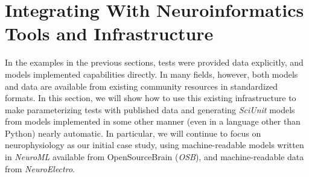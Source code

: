 \documentclass{frontiersSCNS}
\begin{document}
\section{Integrating With Neuroinformatics Tools and Infrastructure}\label{sec:neuronunit}
In the examples in the previous sections, tests were provided data explicitly, and models implemented capabilities directly. 
In many fields, however, both models and data are available from existing  community resources in standardized formats. 
In this section, we will show how to use this existing infrastructure to make parameterizing tests with published data and generating \textit{SciUnit} models from models implemented in some other manner (even in a language other than Python) nearly automatic. 
In particular, we will continue to focus on neurophysiology as our initial case study, using machine-readable models written in \textit{NeuroML} available from OpenSourceBrain (\textit{OSB}), and machine-readable data from \textit{NeuroElectro}. 
\end{document}
